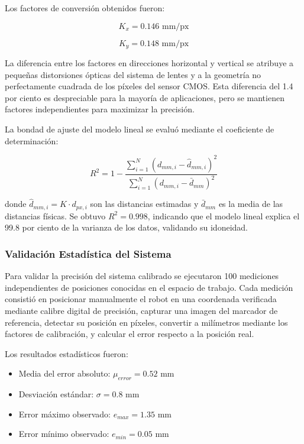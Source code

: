 Los factores de conversión obtenidos fueron:

\begin{equation}
K_x = 0.146 \text{ mm/px}
\end{equation}

\begin{equation}
K_y = 0.148 \text{ mm/px}
\end{equation}

La diferencia entre los factores en direcciones horizontal y vertical se atribuye a pequeñas distorsiones ópticas del sistema de lentes y a la geometría no perfectamente cuadrada de los píxeles del sensor CMOS. Esta diferencia del 1.4 por ciento es despreciable para la mayoría de aplicaciones, pero se mantienen factores independientes para maximizar la precisión.

La bondad de ajuste del modelo lineal se evaluó mediante el coeficiente de determinación:

\begin{equation}
R^2 = 1 - \frac{\sum_{i=1}^{N}(d_{mm,i} - \hat{d}_{mm,i})^2}{\sum_{i=1}^{N}(d_{mm,i} - \bar{d}_{mm})^2}
\end{equation}

donde $\hat{d}_{mm,i} = K \cdot d_{px,i}$ son las distancias estimadas y $\bar{d}_{mm}$ es la media de las distancias físicas. Se obtuvo $R^2 = 0.998$, indicando que el modelo lineal explica el 99.8 por ciento de la varianza de los datos, validando su idoneidad.

\subsubsection{Validación Estadística del Sistema}

Para validar la precisión del sistema calibrado se ejecutaron 100 mediciones independientes de posiciones conocidas en el espacio de trabajo. Cada medición consistió en posicionar manualmente el robot en una coordenada verificada mediante calibre digital de precisión, capturar una imagen del marcador de referencia, detectar su posición en píxeles, convertir a milímetros mediante los factores de calibración, y calcular el error respecto a la posición real.

Los resultados estadísticos fueron:

\begin{itemize}[label=$\bullet$]
\item Media del error absoluto: $\mu_{error} = 0.52$ mm
\item Desviación estándar: $\sigma = 0.8$ mm  
\item Error máximo observado: $e_{max} = 1.35$ mm
\item Error mínimo observado: $e_{min} = 0.05$ mm
\end{itemize}

